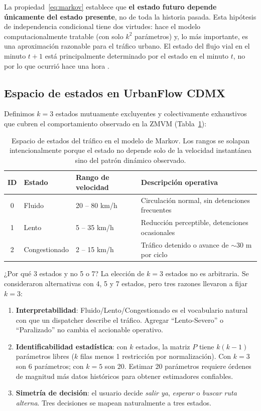 \documentclass[11pt,a4paper]{article}
\begin{document}
La propiedad~\eqref{eq:markov} establece que \textbf{el estado futuro depende únicamente del estado presente}, no de toda la historia pasada. Esta hipótesis de independencia condicional tiene dos virtudes: hace el modelo computacionalmente tratable (con solo $k^2$ parámetros) y, lo más importante, es una aproximación razonable para el tráfico urbano. El estado del flujo vial en el minuto $t+1$ está principalmente determinado por el estado en el minuto $t$, no por lo que ocurrió hace una hora \cite{norris1997}.

\subsection{Espacio de estados en UrbanFlow CDMX}

Definimos $k = 3$ estados mutuamente excluyentes y colectivamente exhaustivos que cubren el comportamiento observado en la ZMVM (Tabla~\ref{tab:estados}):

\begin{table}[H]
\centering
\small
\begin{tabular}{@{}clll@{}}
\toprule
\textbf{ID} & \textbf{Estado} & \textbf{Rango de velocidad} & \textbf{Descripción operativa} \\
\midrule
0 & Fluido & 20 -- 80 km/h & Circulación normal, sin detenciones frecuentes \\
1 & Lento & 5 -- 35 km/h & Reducción perceptible, detenciones ocasionales \\
2 & Congestionado & 2 -- 15 km/h & Tráfico detenido o avance de $\sim$30 m por ciclo \\
\bottomrule
\end{tabular}
\caption{Espacio de estados del tráfico en el modelo de Markov. Los rangos se solapan intencionalmente porque el estado no depende solo de la velocidad instantánea sino del patrón dinámico observado.}
\label{tab:estados}
\end{table}

\begin{insightbox}{¿Por qué 3 estados y no 5 o 7?}
La elección de $k=3$ estados no es arbitraria. Se consideraron alternativas con 4, 5 y 7 estados, pero tres razones llevaron a fijar $k=3$:
\begin{enumerate}[leftmargin=*,noitemsep]
\item \textbf{Interpretabilidad}: Fluido/Lento/Congestionado es el vocabulario natural con que un dispatcher describe el tráfico. Agregar ``Lento-Severo'' o ``Paralizado'' no cambia el accionable operativo.
\item \textbf{Identificabilidad estadística}: con $k$ estados, la matriz $P$ tiene $k(k-1)$ parámetros libres ($k$ filas menos 1 restricción por normalización). Con $k=3$ son 6 parámetros; con $k=5$ son 20. Estimar 20 parámetros requiere órdenes de magnitud más datos históricos para obtener estimadores confiables.
\item \textbf{Simetría de decisión}: el usuario decide \textit{salir ya}, \textit{esperar} o \textit{buscar ruta alterna}. Tres decisiones se mapean naturalmente a tres estados.
\end{enumerate}
\end{insightbox}
\end{document}
